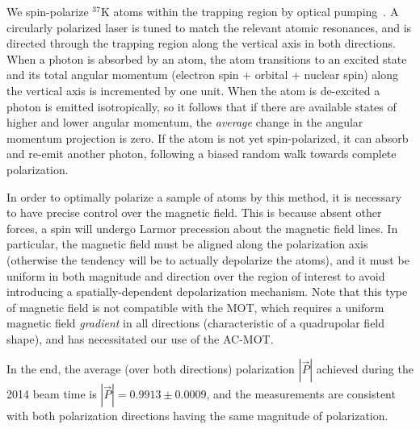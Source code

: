 

We spin-polarize $^{37}\textrm{K}$ atoms within the trapping region by optical pumping~\cite{ben_OP}.  A circularly polarized laser is tuned to match the relevant atomic resonances, and is directed through the trapping region along the vertical axis in both directions.  When a photon is absorbed by an atom, the atom transitions to an excited state and its total angular momentum (electron spin + orbital + nuclear spin) along the vertical axis is incremented by one unit.  When the atom is de-excited a photon is emitted isotropically, 
so it follows that if there are available states of higher and lower angular momentum, the \emph{average} change in the angular momentum projection is zero.  If the atom is not yet spin-polarized, it can absorb and re-emit another photon, following a biased random walk towards complete polarization.  

In order to optimally polarize a sample of atoms by this method, it is necessary to have precise control over the magnetic field.  This is because absent other forces, a spin will undergo Larmor precession about the magnetic field lines.  In particular, the magnetic field must be aligned along the polarization axis (otherwise the tendency will be to actually depolarize the atoms), and it must be uniform in both magnitude and direction over the region of interest to avoid introducing a spatially-dependent depolarization mechanism.  
Note that this type of magnetic field is not compatible with the MOT, which requires a uniform magnetic field \emph{gradient} in all directions (characteristic of a quadrupolar field shape), and has necessitated our use of the AC-MOT.

In the end, the average (over both directions) polarization $|\vec{P}|$ achieved during the 2014 beam time is $|\vec{P}| = 0.9913 \pm 0.0009$, and the measurements are consistent with both polarization directions having the same magnitude of polarization\cite{ben_OP}.



